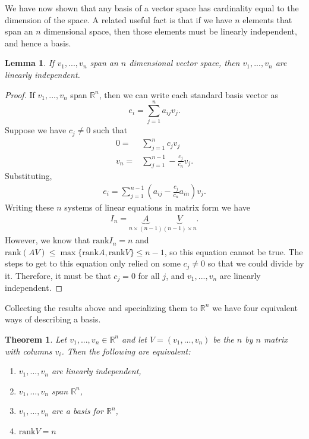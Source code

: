 \documentclass[12pt,reqno]{amsart}
\def\R{\mathbb{R}}
\newcommand{\rank}{\mathrm{rank}}
\newtheorem{theorem}{Theorem}[section]
\newtheorem{lemma}{Lemma}[section]
\theoremstyle{definition}
\begin{document}
We have now shown that any basis of a vector space has cardinality
equal to the dimension of the space. A related useful fact is that if
we have $n$ elements that span an $n$ dimensional space, then those
elements must be linearly independent, and hence a basis. 
\begin{lemma}
  If $v_1, ..., v_n$ span an $n$ dimensional vector space, then $v_1,
  ... , v_n$ are linearly independent.
\end{lemma}
\begin{proof}
  If $v_1, ..., v_n$ span $\R^n$, then we can write each standard
  basis vector as
  \[ e_i = \sum_{j=1}^n a_{ij} v_j. \]
  Suppose we have $c_j \neq 0$ such that
  \begin{align*} 
    0 = & \sum_{j=1}^n c_j v_j \\
    v_n = & \sum_{j=1}^{n-1} -\frac{c_j}{c_n} v_j.
  \end{align*}
  Substituting,
  \begin{align*}
    e_i = \sum_{j=1}^{n-1} (a_{ij} - \frac{c_j}{c_n} a_{in} ) v_j.
  \end{align*}
  Writing these $n$ systems of linear equations in matrix form we have
  \begin{align*}
    I_n = \underbrace{A}_{n\times(n-1)} \underbrace{V}_{(n-1) \times n}.
  \end{align*}
  However, we know that $\rank I_n = n$ and $\rank (A V) \leq
  \max\{\rank A, \rank V\} \leq n-1$, so this equation cannot be
  true. The steps to get to this equation only relied on some $c_j
  \neq 0$ so that we could divide by it. Therefore, it must be that
  $c_j = 0$ for all $j$, and $v_1,...,v_n$ are linearly independent.
\end{proof}

Collecting the results above and specializing them to $\R^n$ we have
four equivalent ways of describing a basis. 
\begin{theorem}\label{thm:lind}
  Let $v_1, ..., v_n \in \R^n$ and let $V = (v_1,...,v_n)$ be the $n$
  by $n$ matrix with columns $v_i$. Then the following are equivalent:
  \begin{enumerate}
  \item $v_1,...,v_n$ are linearly independent,
  \item $v_1,...,v_n$ span $\R^n$,
  \item $v_1,...,v_n$ are a basis for $\R^n$,
  \item $\rank V = n$
  \end{enumerate}
\end{theorem}
\end{document}
